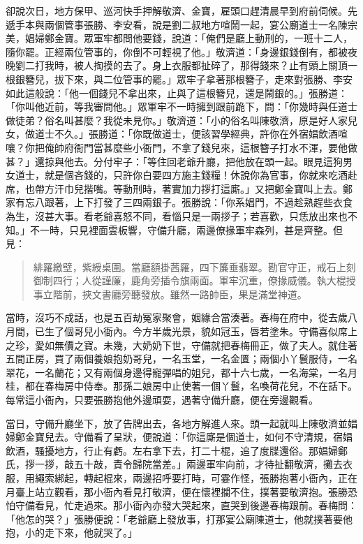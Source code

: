 卻說次日，地方保甲、巡河快手押解敬濟、金寶，雇頭口趕清晨早到府前伺候。先遞手本與兩個管事張勝、李安看，說是劉二叔地方喧鬧一起，宴公廟道士一名陳宗美，娼婦鄭金寶。眾軍牢都問他要錢，說道：「俺們是廳上動刑的，一班十二人，隨你罷。正經兩位管事的，你倒不可輕視了他。」敬濟道：「身邊銀錢倒有，都被夜晚劉二打我時，被人掏摸的去了。身上衣服都扯碎了，那得錢來？止有頭上關頂一根銀簪兒，拔下來，與二位管事的罷。」眾牢子拿著那根簪子，走來對張勝、李安如此這般說：「他一個錢兒不拿出來，止與了這根簪兒，還是鬧銀的。」張勝道：「你叫他近前，等我審問他。」眾軍牢不一時擁到跟前跪下，問：「你幾時與任道士做徒弟？俗名叫甚麼？我從未見你。」敬濟道：「小的俗名叫陳敬濟，原是好人家兒女，做道士不久。」張勝道：「你既做道士，便該習學經典，許你在外宿娼飲酒喧嚷？你把俺帥府衙門當甚麼些小衙門，不拿了錢兒來，這根簪子打水不渾，要他做甚？」還掠與他去。分付牢子：「等住回老爺升廳，把他放在頭一起。眼見這狗男女道士，就是個吝錢的，只許你白要四方施主錢糧！休說你為官事，你就來吃酒赴席，也帶方汗巾兒揩嘴。等動刑時，著實加力拶打這廝。」又把鄭金寶叫上去。鄭家有忘八跟著，上下打發了三四兩銀子。張勝說：「你系娼門，不過趁熟趕些衣食為生，沒甚大事。看老爺喜怒不同，看惱只是一兩拶子；若喜歡，只恁放出來也不知。」不一時，只見裡面雲板響，守備升廳，兩邊僚掾軍牢森列，甚是齊整。但見：
\begin{quote}
緋羅繳壁，紫綬桌圍。當廳額掛茜羅，四下簾垂翡翠。勘官守正，戒石上刻御制四行；人從謹廉，鹿角旁插令旗兩面。軍牢沉重，僚掾威儀。執大棍授事立階前，挾文書廳旁聽發放。雖然一路帥臣，果是滿堂神道。
\end{quote}

當時，沒巧不成話，也是五百劫冤家聚會，姻緣合當湊著。春梅在府中，從去歲八月間，已生了個哥兒小衙內。今方半歲光景，貌如冠玉，唇若塗朱。守備喜似席上之珍，愛如無價之寶。未幾，大奶奶下世，守備就把春梅冊正，做了夫人。就住著五間正房，買了兩個養娘抱奶哥兒，一名玉堂，一名金匱；兩個小丫鬟服侍，一名翠花，一名蘭花；又有兩個身邊得寵彈唱的姐兒，都十六七歲，一名海棠，一名月桂，都在春梅房中侍奉。那孫二娘房中止使著一個丫鬟，名喚荷花兒，不在話下。每常這小衙內，只要張勝抱他外邊頑耍，遇著守備升廳，便在旁邊觀看。

當日，守備升廳坐下，放了告牌出去，各地方解進人來。頭一起就叫上陳敬濟並娼婦鄭金寶兒去。守備看了呈狀，便說道：「你這廝是個道士，如何不守清規，宿娼飲酒，騷擾地方，行止有虧。左右拿下去，打二十棍，追了度牒還俗。那娼婦鄭氏，拶一拶，敲五十敲，責令歸院當差。」兩邊軍牢向前，才待扯翻敬濟，攤去衣服，用繩索綁起，轉起棍來，兩邊招呼要打時，可霎作怪，張勝抱著小衙內，正在月臺上站立觀看，那小衙內看見打敬濟，便在懷裡攔不住，撲著要敬濟抱。張勝恐怕守備看見，忙走過來。那小衙內亦發大哭起來，直哭到後邊春梅跟前。春梅問：「他怎的哭？」張勝便說：「老爺廳上發放事，打那宴公廟陳道士，他就撲著要他抱，小的走下來，他就哭了。」

